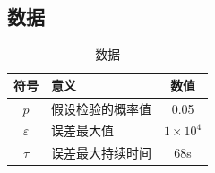 \documentclass[UTF8]{article}
\begin{document}
\begin{appendix}
\section{数据}
\begin{table}[htbp]
\centering
\caption{数据}
\begin{tabular}{|c|l|c|}
\hline
符号&意义&数值\\
\hline
\(p\)&假设检验的概率值&0.05\\
\hline
\(\varepsilon\)&误差最大值&\(1\times10^4\)\\
\hline
\(\tau\)&误差最大持续时间&68s\\
\hline
\end{tabular}
\end{table}
\end{appendix}
\end{document}
